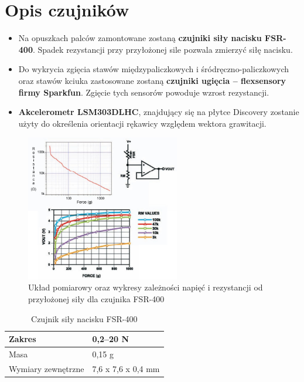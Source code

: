 \documentclass[12pt,a4paper]{article}
\begin{document}
\section{Opis czujników}
\begin{itemize}
\item Na opuszkach palców zamontowane zostaną \textbf{czujniki siły nacisku FSR-400}. Spadek rezystancji przy przyłożonej sile pozwala zmierzyć siłę nacisku.
\item Do wykrycia zgięcia stawów międzypaliczkowych i śródręczno-paliczkowych oraz stawów kciuka zastosowane zostaną \textbf{czujniki ugięcia -- flexsensory firmy Sparkfun}. Zgięcie tych sensorów powoduje wzrost rezystancji.
\item \textbf{Akcelerometr LSM303DLHC}, znajdujący się na płytce Discovery zostanie użyty do określenia orientacji rękawicy względem wektora grawitacji.
\end{itemize}

\begin{figure}[h]
\centering
\includegraphics[width=0.6\textwidth]{./fsr-400.jpg}
\caption{Układ pomiarowy oraz wykresy zależności napięć i rezystancji od przyłożonej siły dla czujnika FSR-400}
\end{figure}

\begin{table}[h]
\centering
\begin{tabularx}
{\textwidth}{ |X|X| }
\hline
Zakres & 0,2--20 N \\
\hline
Masa & 0,15 g \\ 
\hline
Wymiary zewnętrzne & 7,6 x 7,6 x 0,4 mm \\
\hline
\end{tabularx}
\caption{Czujnik siły nacisku FSR-400}
\end{table}
\end{document}
